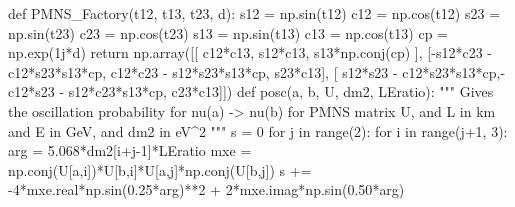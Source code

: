 \documentclass[
  letterpaper,
  DIV=11,
  numbers=noendperiod]{scrreprt}
\newenvironment{Shaded}{\begin{snugshade}}{\end{snugshade}}
\newcommand{\BuiltInTok}[1]{\textcolor[rgb]{0.00,0.23,0.31}{#1}}
\newcommand{\CommentTok}[1]{\textcolor[rgb]{0.37,0.37,0.37}{#1}}
\newcommand{\ControlFlowTok}[1]{\textcolor[rgb]{0.00,0.23,0.31}{#1}}
\newcommand{\DecValTok}[1]{\textcolor[rgb]{0.68,0.00,0.00}{#1}}
\newcommand{\FloatTok}[1]{\textcolor[rgb]{0.68,0.00,0.00}{#1}}
\newcommand{\KeywordTok}[1]{\textcolor[rgb]{0.00,0.23,0.31}{#1}}
\newcommand{\NormalTok}[1]{\textcolor[rgb]{0.00,0.23,0.31}{#1}}
\newcommand{\OperatorTok}[1]{\textcolor[rgb]{0.37,0.37,0.37}{#1}}
\newcommand{\OtherTok}[1]{\textcolor[rgb]{0.00,0.23,0.31}{#1}}
\begin{document}
\begin{Shaded}
\begin{Highlighting}[]
\KeywordTok{def}\NormalTok{ PMNS\_Factory(t12, t13, t23, d):}
\NormalTok{    s12 }\OperatorTok{=}\NormalTok{ np.sin(t12)}
\NormalTok{    c12 }\OperatorTok{=}\NormalTok{ np.cos(t12)}
\NormalTok{    s23 }\OperatorTok{=}\NormalTok{ np.sin(t23)}
\NormalTok{    c23 }\OperatorTok{=}\NormalTok{ np.cos(t23)}
\NormalTok{    s13 }\OperatorTok{=}\NormalTok{ np.sin(t13)}
\NormalTok{    c13 }\OperatorTok{=}\NormalTok{ np.cos(t13)}
\NormalTok{    cp  }\OperatorTok{=}\NormalTok{ np.exp(}\OtherTok{1j}\OperatorTok{*}\NormalTok{d)}
    \ControlFlowTok{return}\NormalTok{ np.array([[ c12}\OperatorTok{*}\NormalTok{c13, s12}\OperatorTok{*}\NormalTok{c13, s13}\OperatorTok{*}\NormalTok{np.conj(cp) ],}
\NormalTok{                  [}\OperatorTok{{-}}\NormalTok{s12}\OperatorTok{*}\NormalTok{c23 }\OperatorTok{{-}}\NormalTok{ c12}\OperatorTok{*}\NormalTok{s23}\OperatorTok{*}\NormalTok{s13}\OperatorTok{*}\NormalTok{cp, c12}\OperatorTok{*}\NormalTok{c23 }\OperatorTok{{-}}\NormalTok{ s12}\OperatorTok{*}\NormalTok{s23}\OperatorTok{*}\NormalTok{s13}\OperatorTok{*}\NormalTok{cp, s23}\OperatorTok{*}\NormalTok{c13],}
\NormalTok{                  [ s12}\OperatorTok{*}\NormalTok{s23 }\OperatorTok{{-}}\NormalTok{ c12}\OperatorTok{*}\NormalTok{s23}\OperatorTok{*}\NormalTok{s13}\OperatorTok{*}\NormalTok{cp,}\OperatorTok{{-}}\NormalTok{c12}\OperatorTok{*}\NormalTok{s23 }\OperatorTok{{-}}\NormalTok{ s12}\OperatorTok{*}\NormalTok{c23}\OperatorTok{*}\NormalTok{s13}\OperatorTok{*}\NormalTok{cp, c23}\OperatorTok{*}\NormalTok{c13]])}
\KeywordTok{def}\NormalTok{ posc(a, b, U, dm2, LEratio):}
    \CommentTok{"""}
\CommentTok{    Gives the oscillation probability for nu(a) {-}\textgreater{} nu(b)}
\CommentTok{    for PMNS matrix U, and L in km and E in GeV, and dm2 in eV\^{}2}
\CommentTok{    """}
\NormalTok{    s }\OperatorTok{=} \DecValTok{0}
    \ControlFlowTok{for}\NormalTok{ j }\KeywordTok{in} \BuiltInTok{range}\NormalTok{(}\DecValTok{2}\NormalTok{):}
        \ControlFlowTok{for}\NormalTok{ i }\KeywordTok{in} \BuiltInTok{range}\NormalTok{(j}\OperatorTok{+}\DecValTok{1}\NormalTok{, }\DecValTok{3}\NormalTok{):}
\NormalTok{            arg }\OperatorTok{=} \FloatTok{5.068}\OperatorTok{*}\NormalTok{dm2[i}\OperatorTok{+}\NormalTok{j}\OperatorTok{{-}}\DecValTok{1}\NormalTok{]}\OperatorTok{*}\NormalTok{LEratio}
\NormalTok{            mxe }\OperatorTok{=}\NormalTok{ np.conj(U[a,i])}\OperatorTok{*}\NormalTok{U[b,i]}\OperatorTok{*}\NormalTok{U[a,j]}\OperatorTok{*}\NormalTok{np.conj(U[b,j])}
\NormalTok{            s }\OperatorTok{+=} \OperatorTok{{-}}\DecValTok{4}\OperatorTok{*}\NormalTok{mxe.real}\OperatorTok{*}\NormalTok{np.sin(}\FloatTok{0.25}\OperatorTok{*}\NormalTok{arg)}\OperatorTok{**}\DecValTok{2} \OperatorTok{+} \DecValTok{2}\OperatorTok{*}\NormalTok{mxe.imag}\OperatorTok{*}\NormalTok{np.sin(}\FloatTok{0.50}\OperatorTok{*}\NormalTok{arg)}

\end{Highlighting}
\end{Shaded}
\end{document}
